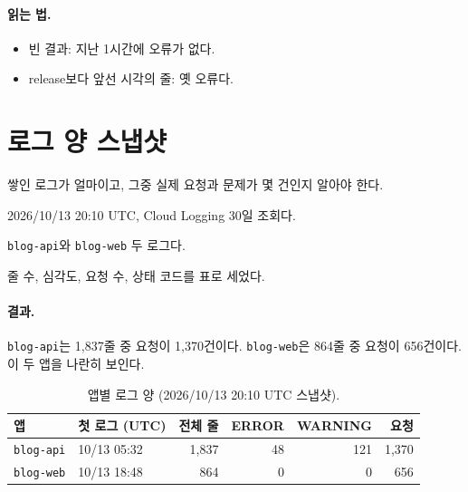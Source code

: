 \paragraph{읽는 법.}
\begin{itemize}[nosep]
  \item 빈 결과: 지난 1시간에 오류가 없다.
  \item release보다 앞선 시각의 줄: 옛 오류다.
\end{itemize}

\section{로그 양 스냅샷}\label{sec:06-volume}

\begin{inbrief}
  \item[Why] 쌓인 로그가 얼마이고, 그중 실제 요청과 문제가 몇 건인지 알아야 한다.
  \item[When] 2026/10/13 20:10 UTC, Cloud Logging 30일 조회다.
  \item[Where] \texttt{blog-api}와 \texttt{blog-web} 두 로그다.
  \item[How] 줄 수, 심각도, 요청 수, 상태 코드를 표로 세었다.
\end{inbrief}

\paragraph{결과.}
\texttt{blog-api}는 1,837줄 중 요청이 1,370건이다.
\texttt{blog-web}은 864줄 중 요청이 656건이다.
이 두 앱을 나란히 보인다.

\begin{table}[H]
  \caption{앱별 로그 양 (2026/10/13 20:10 UTC 스냅샷).}\label{tab:06-volume}
  \small
  \begin{tabularx}{\linewidth}{l l r r r r}
    \toprule
    앱 & 첫 로그 (UTC) & 전체 줄 & ERROR & WARNING & 요청 \\
    \midrule
    \texttt{blog-api} & 10/13 05:32 & 1,837 & 48 & 121 & 1,370 \\
    \midrule
    \texttt{blog-web} & 10/13 18:48 & 864 & 0 & 0 & 656 \\
    \bottomrule
  \end{tabularx}
\end{table}

